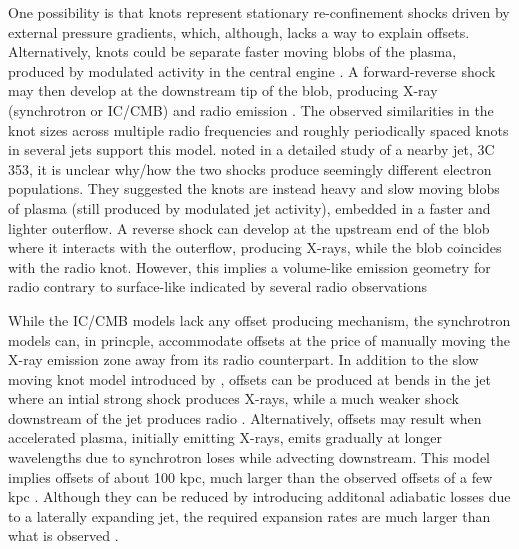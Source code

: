 One possibility is that knots represent stationary re-confinement shocks driven by external pressure gradients\citep[e.g.,][]{komissarov1998large}, which, although, lacks a way to explain offsets. Alternatively, knots could be separate faster moving blobs of the plasma, produced by modulated activity in the central engine  \citep[e.g.,][]{bridle1986collimation,bridle1989unusual,clarke1992origin,stawarz2004multiwavelength}. A forward-reverse shock may then develop at the downstream tip of the blob, producing X-ray (synchrotron or IC/CMB) and radio emission \citep{stawarz2004multiwavelength}. The observed similarities in the knot sizes across multiple radio frequencies and roughly periodically spaced knots in several jets support this model. \citep{kataoka2008chandra} noted in a detailed study of a nearby jet, 3C 353, it is unclear why/how the two shocks produce seemingly different electron populations. They suggested the knots are instead heavy and slow moving blobs of plasma (still produced by modulated jet activity), embedded in a faster and lighter outerflow. A reverse shock can develop at the upstream end of the blob where it interacts with the outerflow, producing X-rays, while the blob coincides with the radio knot. However, this implies a volume-like emission geometry for radio contrary to surface-like indicated by several radio observations \cite[e.g.,][]{swain1998internal}  

While the IC/CMB models lack any offset producing mechanism, the synchrotron models can, in princple, accommodate offsets at the price of manually moving the X-ray emission zone away from its radio counterpart. In addition to the slow moving knot model introduced by \citet{kataoka2008chandra}, offsets can be produced at bends in the jet where an intial strong shock produces X-rays, while a much weaker shock downstream of the jet produces radio \citep{2005MNRAS.360..926W}. Alternatively, offsets may result when accelerated plasma, initially emitting X-rays, emits gradually at longer wavelengths due to synchrotron loses while advecting downstream. This model implies offsets of about 100 kpc, much larger than the observed offsets of a few kpc \citep[e.g.,][]{siemiginowska2007300,Clautice:2016zai}. Although they can be reduced by introducing additonal adiabatic losses due to a laterally expanding jet, the required expansion rates are much larger than what is observed \citep[e.g.,][]{swain1998internal,kataoka2008chandra}.

